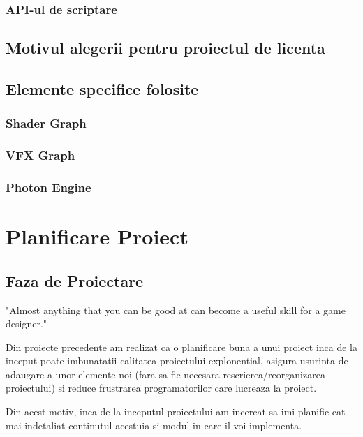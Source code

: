 \documentclass[12pt, a4paper]{article}
\begin{document}
	\subsubsection{API-ul de scriptare}
	
	\subsection{Motivul alegerii pentru proiectul de licenta}

	\subsection{Elemente specifice folosite}	
	
	\subsubsection{Shader Graph}
	
	\subsubsection{VFX Graph}
	
	\subsubsection{Photon Engine}
	
	
	
	\section{Planificare Proiect}
	
	\subsection{Faza de Proiectare}
	
	"Almost anything that you can be good at can become a useful
	skill for a game designer." \cite{bookOfLenses}
	
	Din proiecte precedente am realizat ca o planificare buna a unui proiect inca de la inceput poate imbunatatii calitatea proiectului explonential, asigura usurinta de adaugare a unor elemente noi (fara sa fie necesara rescrierea/reorganizarea proiectului) si reduce frustrarea programatorilor care lucreaza la proiect.
	
	Din acest motiv, inca de la inceputul proiectului am incercat sa imi planific cat mai indetaliat continutul acestuia si modul in care il voi implementa.
	
\end{document}
